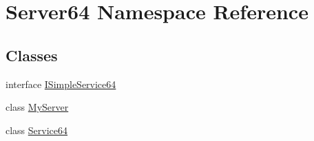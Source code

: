 \hypertarget{namespace_server64}{}\section{Server64 Namespace Reference}
\label{namespace_server64}
\subsection*{Classes}
\begin{DoxyCompactItemize}
\item 
interface \mbox{\hyperlink{interface_server64_1_1_i_simple_service64}{I\+Simple\+Service64}}
\item 
class \mbox{\hyperlink{class_server64_1_1_my_server}{My\+Server}}
\item 
class \mbox{\hyperlink{class_server64_1_1_service64}{Service64}}
\end{DoxyCompactItemize}
